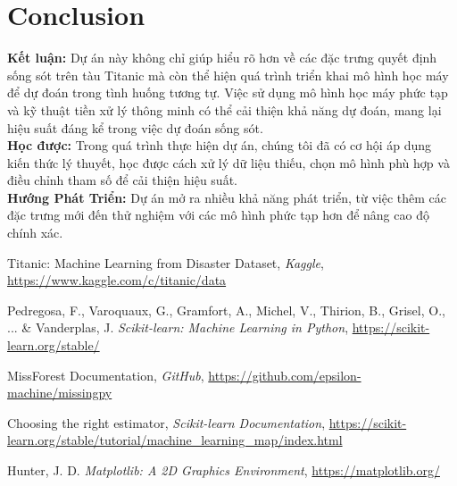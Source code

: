 \documentclass[11pt]{article}
\begin{document}
\section{Conclusion}
     \textbf{Kết luận:}  Dự án này không chỉ giúp hiểu rõ hơn về các đặc trưng quyết định sống sót trên tàu Titanic mà còn thể hiện quá trình triển khai mô hình học máy để dự đoán trong tình huống tương tự. Việc sử dụng mô hình học máy phức tạp và kỹ thuật tiền xử lý thông minh có thể cải thiện khả năng dự đoán, mang lại hiệu suất đáng kể trong việc dự đoán sống sót.\\
     \textbf{Học được:} Trong quá trình thực hiện dự án, chúng tôi đã có cơ hội áp dụng kiến thức lý thuyết, học được cách xử lý dữ liệu thiếu, chọn mô hình phù hợp và điều chỉnh tham số để cải thiện hiệu suất.\\
     \textbf{Hướng Phát Triển:}
  Dự án mở ra nhiều khả năng phát triển, từ việc thêm các đặc trưng mới đến thử nghiệm với các mô hình phức tạp hơn để nâng cao độ chính xác.

\begin{thebibliography}{9}

    Titanic: Machine Learning from Disaster Dataset,
    \textit{Kaggle},
    \url{https://www.kaggle.com/c/titanic/data}

    Pedregosa, F., Varoquaux, G., Gramfort, A., Michel, V., Thirion, B., Grisel, O., ... \& Vanderplas, J.
    \textit{Scikit-learn: Machine Learning in Python},
    \url{https://scikit-learn.org/stable/}

    MissForest Documentation,
    \textit{GitHub},
    \url{https://github.com/epsilon-machine/missingpy}

    Choosing the right estimator,
    \textit{Scikit-learn Documentation},
    \url{https://scikit-learn.org/stable/tutorial/machine_learning_map/index.html}


    Hunter, J. D.
    \textit{Matplotlib: A 2D Graphics Environment},
    \url{https://matplotlib.org/}

\end{thebibliography}
\end{document}
